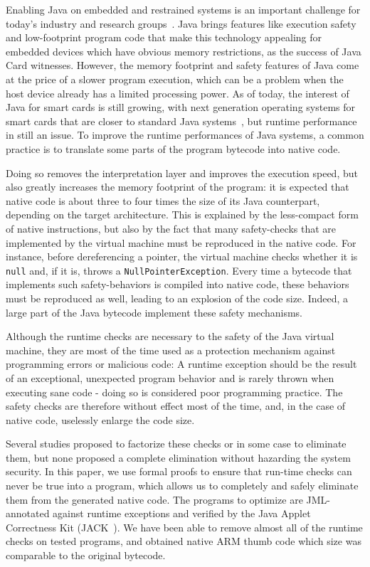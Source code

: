 Enabling Java on embedded and restrained systems is an important challenge for today's industry and research groups~\cite{Mulchandani1998}. Java brings features like execution safety and low-footprint program code that make this technology appealing for embedded devices which have obvious memory restrictions, as the success of Java Card witnesses. However, the memory footprint and safety features of Java come at the price of a slower program execution, which can be a problem when the host device already has a limited processing power. As of today, the interest of Java for smart cards is still growing, with next generation operating systems for smart cards that are closer to standard Java systems~\cite{Lagosanto2002,Grimaud2003}, but runtime performance in still an issue. To improve the runtime performances of Java systems, a common practice is to translate some parts of the program bytecode into native code.

Doing so removes the interpretation layer and improves the execution speed, but also greatly increases the memory footprint of the program: it is expected that native code is about three to four times the size of its Java counterpart, depending on the target architecture. This is explained by the less-compact form of native instructions, but also by the fact that many safety-checks that are implemented by the virtual machine must be reproduced in the native code. For instance, before dereferencing a pointer, the virtual machine checks whether it is \texttt{null} and, if it is, throws a \texttt{NullPointerException}. Every time a bytecode that implements such safety-behaviors is compiled into native code, these behaviors must be reproduced as well, leading to an explosion of the code size. Indeed, a large part of the Java bytecode implement these safety mechanisms.

Although the runtime checks are necessary to the safety of the Java virtual machine, they are most of the time used as a protection mechanism against programming errors or malicious code: A runtime exception should be the result of an exceptional, unexpected program behavior and is rarely thrown when executing sane code - doing so is considered poor programming practice. The safety checks are therefore without effect most of the time, and, in the case of native code, uselessly enlarge the code size.

Several studies proposed to factorize these checks or in some case to eliminate them, but none proposed a complete elimination without hazarding the system security. In this paper, we use formal proofs to ensure that run-time checks can never be true into a program, which allows us to completely and safely eliminate them from the generated native code. The programs to optimize are JML-annotated against runtime exceptions and verified by the Java Applet Correctness Kit (JACK~\cite{BRL-JACK}). We have been able to remove almost all of the runtime checks on tested programs, and obtained native ARM thumb code which size was comparable to the original bytecode.

